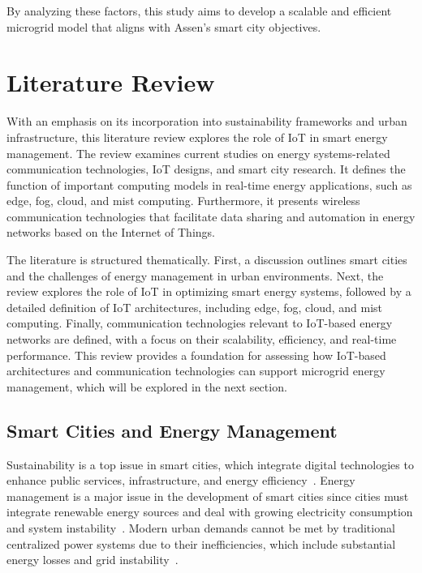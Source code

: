 \documentclass[conference]{IEEEtran}
\begin{document}
By analyzing these factors, this study aims to develop a scalable and efficient microgrid model that aligns with Assen’s smart city objectives.


\section{Literature Review}

With an emphasis on its incorporation into sustainability frameworks and urban infrastructure, this literature review explores the role of IoT in smart energy management. The review examines current studies on energy systems-related communication technologies, IoT designs, and smart city research. It defines the function of important computing models in real-time energy applications, such as edge, fog, cloud, and mist computing. Furthermore, it presents wireless communication technologies that facilitate data sharing and automation in energy networks based on the Internet of Things.

The literature is structured thematically. First, a discussion outlines smart cities and the challenges of energy management in urban environments. Next, the review explores the role of IoT in optimizing smart energy systems, followed by a detailed definition of IoT architectures, including edge, fog, cloud, and mist computing. Finally, communication technologies relevant to IoT-based energy networks are defined, with a focus on their scalability, efficiency, and real-time performance. This review provides a foundation for assessing how IoT-based architectures and communication technologies can support microgrid energy management, which will be explored in the next section.

\subsection{Smart Cities and Energy Management}

Sustainability is a top issue in smart cities, which integrate digital technologies to enhance public services, infrastructure, and energy efficiency~\cite{smartcities4020024}. Energy management is a major issue in the development of smart cities since cities must integrate renewable energy sources and deal with growing electricity consumption and system instability~\cite{en14185976}. Modern urban demands cannot be met by traditional centralized power systems due to their inefficiencies, which include substantial energy losses and grid instability~\cite{10474733}.
\end{document}
